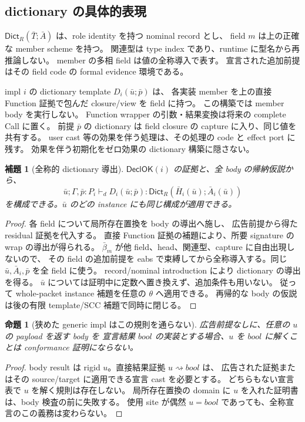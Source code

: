 \documentclass[11pt,a4paper]{article}
\newtheorem{lemma}[definition]{補題}
\newtheorem{proposition}[definition]{命題}
\newcommand{\Dict}{\mathsf{Dict}}
\newcommand{\Ty}{\mathrel{\vdash_d}}
\newcommand{\Dir}{\mathrel{\rightsquigarrow}}
\begin{document}
\subsection{dictionary の具体的表現}

\(\Dict_R(\bar T;\bar A)\) は、role identity を持つ nominal record とし、
field \(m\) は上の正確な member scheme を持つ。
関連型は type index であり、runtime に型名から再推論しない。
member の多相 field は値の全称導入で表す。
宣言された追加前提はその field code の formal evidence 環境である。

impl \(i\) の dictionary template \(D_i(\bar u;\bar p)\) は、
各実装 member を上の直接 Function 証拠で包んだ closure/view を field に持つ。
この構築では member body を実行しない。
Function wrapper の引数・結果変換は将来の complete Call に置く。
前提 \(\bar p\) の dictionary は field closure の capture に入り、同じ値を共有する。
user cast 等の効果を伴う処理は、その処理の code と effect port に残す。
効果を伴う初期化をゼロ効果の dictionary 構築に隠さない。

\begin{lemma}[全称的 dictionary 導出]
\(\mathsf{DeclOK}(i)\) の証拠と、全 body の帰納仮説から、
\[
 \bar u;\Gamma,\bar p:P_i\Ty
 D_i(\bar u;\bar p):\Dict_R(\bar H_i(\bar u);\bar A_i(\bar u))
\]
を構成できる。\(\bar u\) のどの instance にも同じ構成が適用できる。
\end{lemma}
\begin{proof}
各 field について局所存在置換を body の導出へ施し、
広告前提から得た residual 証拠を代入する。
直接 Function 証拠の補題により、所要 signature の wrap の導出が得られる。
\(\bar\beta_m\) が他 field、head、関連型、capture に自由出現しないので、
その field の追加前提を eabs で束縛してから全称導入する。同じ \(\bar u,\bar A_i,\bar p\) を全 field に使う。
record/nominal introduction により dictionary の導出を得る。
\(\bar u\) については証明中に定数へ置き換えず、追加条件も用いない。
従って whole-packet instance 補題を任意の \(\theta\) へ適用できる。
再帰的な body の仮説は後の有限 template/SCC 補題で同時に閉じる。
\end{proof}

\begin{proposition}[狭めた generic impl はこの規則を通らない]
広告前提なしに、任意の \(u\) の payload を返す body を
宣言結果 \(bool\) の実装とする場合、\(u\) を \(bool\) に解くことは conformance 証明にならない。
\end{proposition}
\begin{proof}
body result は rigid \(u\)。直接結果証拠 \(u\Dir bool\) は、
広告された証拠またはその source/target に適用できる宣言 cast を必要とする。
どちらもない宣言表で \(u\) を解く規則は存在しない。
局所存在置換の domain に \(u\) を入れた証明書は、body 検査の前に失敗する。
使用 site が偶然 \(u=bool\) であっても、全称宣言のこの義務は変わらない。
\end{proof}
\end{document}
